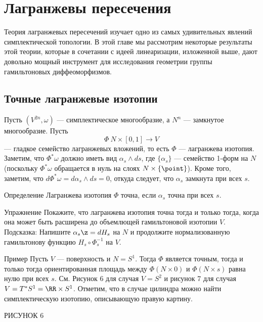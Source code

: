 \chapter{Лагранжевы пересечения}

Теория лагранжевых пересечений изучает одно из самых удивительных явлений симплектической топологии.
В этой главе мы рассмотрим некоторые результаты этой теории, которые в сочетании с идеей линеаризации, изложенной выше, дают довольно мощный инструмент для исследования геометрии группы гамильтоновых диффеоморфизмов.

\section{Точные лагранжевые изотопии}
Пусть $(V^{2n}, \omega)$ --- симплектическое многообразие, а $N^n$ --- замкнутое многообразие.
Пусть 
\[\Phi\: N \times [0, 1] \to V\]
--- гладкое семейство лагранжевых вложений, то есть $\Phi$ --- лагранжева изотопия.
Заметим, что $\Phi^\ast \omega$ должно иметь вид $\alpha_s \wedge ds$, где $\{\alpha_s\}$ --- семейство 1-форм на $N$ (поскольку $\Phi^\ast \omega$ обращается в нуль на слоях $N \times \{\point\}$).
Кроме того, заметим, что $d\Phi^\ast \omega = d\alpha_s \wedge ds = 0$, откуда следует, что $\alpha_s$ замкнута при всех $s$.

\begin{thm*}{Определение}
Лагранжева изотопия $\Phi$ точна, если $\alpha_s$ точна при всех $s$.
\end{thm*}

\begin{thm}{Упражнение}\label{6.1.A}
Покажите, что лагранжева изотопия точна тогда и только тогда, когда она может быть расширена до объемлющей гамильтоновой изотопии $V$.
Подсказка: Напишите $\alpha_s \z= dH_s$ на $N$ и продолжите нормализованную гамильтонову функцию $H_s \circ \Phi^{-1}_s$ на $V$.
\end{thm}

\begin{thm*}{Пример}
Пусть $V$ --- поверхность и $N = S^1$.
Тогда $\Phi$ является точным, тогда и только тогда ориентированная площадь между $\Phi (N \times {0})$ и $\Phi (N \times {s})$ равна нулю при всех $s$.
См. Рисунок 6 для случая $V = S^2$ и рисунок 7 для случая $V = T^\ast S^1 = \RR \times S^1$.
Отметим, что в случае цилиндра можно найти симплектическую изотопию, описывающую правую картину.
\end{thm*}

РИСУНОК 6

